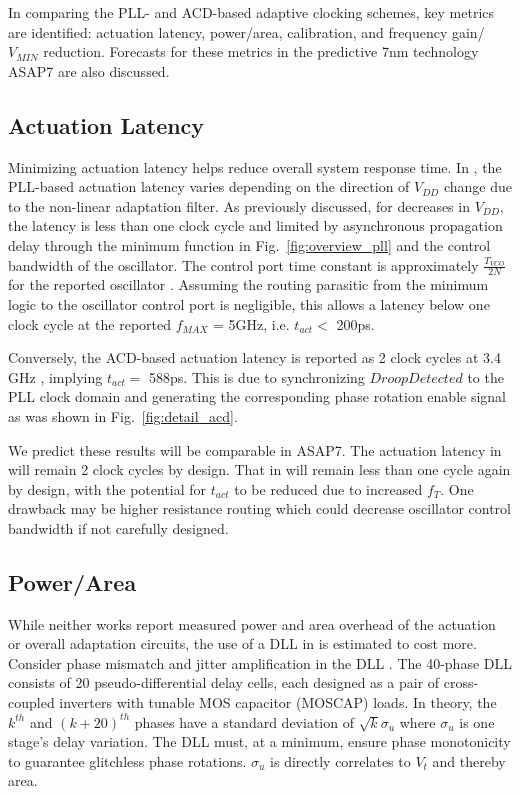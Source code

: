 \documentclass[twoside,9pt,journal,letterpage]{IEEEtran}
\begin{document}
In comparing the PLL- and ACD-based adaptive clocking schemes, key metrics are identified: actuation latency, power/area, calibration, and frequency gain/$V_{MIN}$ reduction. Forecasts for these metrics in the predictive 7nm technology ASAP7 \cite{asap7} are also discussed.

\vspace{-10pt}
\subsection{Actuation Latency}
\label{sec:ActuationLatency}
Minimizing actuation latency helps reduce overall system response time. In \cite{hashimoto2018}, the PLL-based actuation latency varies depending on the direction of $V_{DD}$ change due to the non-linear adaptation filter. As previously discussed, for decreases in $V_{DD}$, the latency is less than one clock cycle and limited by asynchronous propagation delay through the minimum function in Fig.\ \ref{fig:overview_pll} and the control bandwidth of the oscillator. The control port time constant is approximately $\frac{T_{VCO}}{2N}$ for the reported oscillator \cite{hashimoto2018}. Assuming the routing parasitic from the minimum logic to the oscillator control port is negligible, this allows a latency below one clock cycle at the reported $f_{MAX}$ = 5GHz, i.e. $t_{act} <$ 200ps.

Conversely, the ACD-based actuation latency is reported as 2 clock cycles at 3.4 GHz \cite{wilcox2015}, implying $t_{act} =$ 588ps. This is due to synchronizing $DroopDetected$ to the PLL clock domain  and generating the corresponding phase rotation enable signal as was shown in Fig.\ \ref{fig:detail_acd}.

We predict these results will be comparable in ASAP7. The actuation latency in \cite{wilcox2015} will remain 2 clock cycles by design. That in \cite{hashimoto2018} will remain less than one cycle again by design, with the potential for $t_{act}$ to be reduced due to increased $f_{T}$. One drawback may be higher resistance routing which could decrease oscillator control bandwidth if not carefully designed.

\vspace{-10pt}
\subsection{Power/Area}
\label{sec:power_area}
While neither works report measured power and area overhead of the actuation or overall adaptation circuits, the use of a DLL in \cite{wilcox2015} is estimated to cost more. Consider phase mismatch and jitter amplification in the DLL \cite{wilcox2015}. The 40-phase DLL consists of 20 pseudo-differential delay cells, each designed as a pair of cross-coupled inverters with tunable MOS capacitor (MOSCAP) loads. In theory, the $k^{th}$ and $(k+20)^{th}$ phases have a standard deviation of $\sqrt{k} \sigma_{u}$ where $\sigma_{u}$ is one stage's delay variation. The DLL must, at a minimum, ensure phase monotonicity to guarantee glitchless phase rotations. $\sigma_{u}$ is directly correlates to $V_{t}$ and thereby area.
\end{document}
